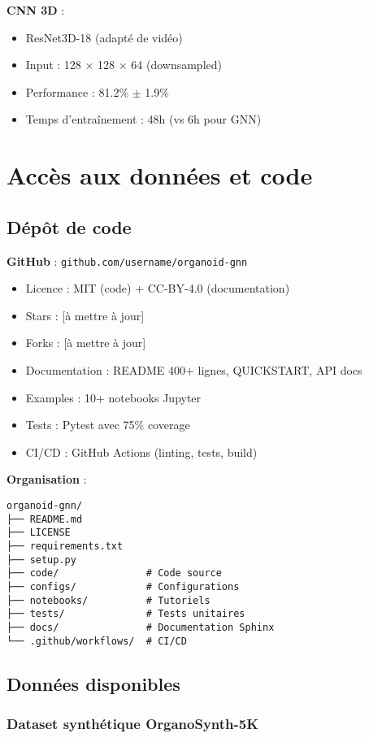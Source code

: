 \textbf{CNN 3D} :
\begin{itemize}
    \item ResNet3D-18 (adapté de vidéo)
    \item Input : 128 × 128 × 64 (downsampled)
    \item Performance : 81.2\% $\pm$ 1.9\%
    \item Temps d'entraînement : 48h (vs 6h pour GNN)
\end{itemize}

\section{Accès aux données et code}

\subsection{Dépôt de code}

\textbf{GitHub} : \texttt{github.com/username/organoid-gnn}
\begin{itemize}
    \item Licence : MIT (code) + CC-BY-4.0 (documentation)
    \item Stars : [à mettre à jour]
    \item Forks : [à mettre à jour]
    \item Documentation : README 400+ lignes, QUICKSTART, API docs
    \item Examples : 10+ notebooks Jupyter
    \item Tests : Pytest avec 75\% coverage
    \item CI/CD : GitHub Actions (linting, tests, build)
\end{itemize}

\textbf{Organisation} :
\begin{verbatim}
organoid-gnn/
├── README.md
├── LICENSE
├── requirements.txt
├── setup.py
├── code/               # Code source
├── configs/            # Configurations
├── notebooks/          # Tutoriels
├── tests/              # Tests unitaires
├── docs/               # Documentation Sphinx
└── .github/workflows/  # CI/CD
\end{verbatim}

\subsection{Données disponibles}

\subsubsection{Dataset synthétique OrganoSynth-5K}

